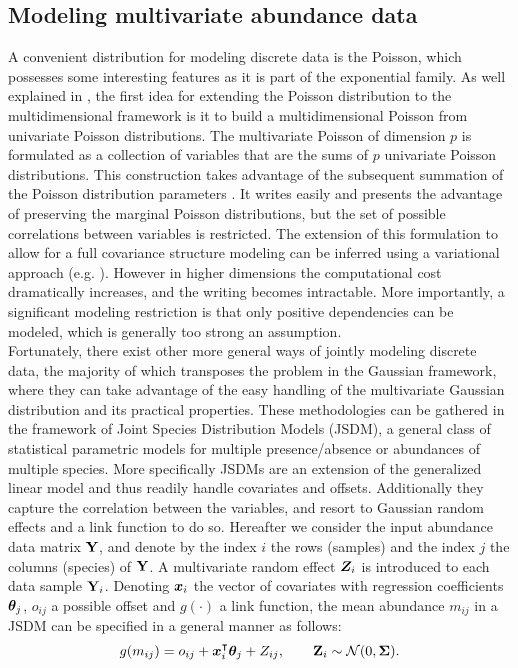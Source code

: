  
  \subsection{Modeling multivariate abundance data}
  A convenient distribution for modeling discrete data is the Poisson, which possesses some interesting features as it is part of the exponential family. As well explained in \citet{inouye}, the first idea for extending the Poisson distribution to the multidimensional framework is it to build a multidimensional Poisson from univariate Poisson distributions. The multivariate Poisson of dimension $p$ is formulated as a collection of variables that are the sums of $p$ univariate Poisson distributions. This construction  takes advantage of the subsequent summation of the Poisson distribution parameters \citep{T54}. It writes easily and presents the advantage of preserving the marginal Poisson distributions, but the set of possible correlations between variables is restricted. The extension of this formulation to allow  for a full covariance structure modeling can be inferred using a variational approach (e.g. \citet{K03}). However in higher dimensions the computational cost dramatically increases, and the writing becomes intractable. More importantly, a significant modeling restriction is that only positive dependencies can be modeled, which is generally too strong an assumption. \\

Fortunately, there exist other more general ways of jointly modeling discrete data,  the majority of which transposes the problem in the Gaussian framework, where they can take advantage of the easy handling of the multivariate Gaussian distribution and its practical properties. These methodologies can be gathered in the framework of Joint Species Distribution Models (JSDM), a general class of statistical parametric models for multiple presence/absence or abundances of multiple species. More specifically JSDMs are an extension of the generalized linear model and thus readily handle covariates and offsets. Additionally they capture the correlation between the variables, and resort to Gaussian random effects and a link function to do so. Hereafter we consider the input abundance data matrix ${\bf Y}$, and denote by the index $i$ the rows (samples) and the index $j$ the columns (species) of ${\bf Y}$. A multivariate random effect ${\boldsymbol{Z}}_i$ is introduced to each data sample ${\bf Y}_i$.  Denoting ${\boldsymbol{x}}_i$ the vector of covariates with regression coefficients ${\boldsymbol{\theta}}_j$, $o_{ij}$ a possible offset  and $g(\cdot)$ a link function, the mean abundance $m_{ij}$  in a JSDM can be specified in a general manner as follows:
$$g(m_{ij}) = o_{ij}+{\boldsymbol{x}}_i^\intercal  {\boldsymbol{\theta}}_j + Z_{ij}, \qquad {\bf Z}_i \sim \mathcal{N}(0, {\boldsymbol{\Sigma}}).$$

